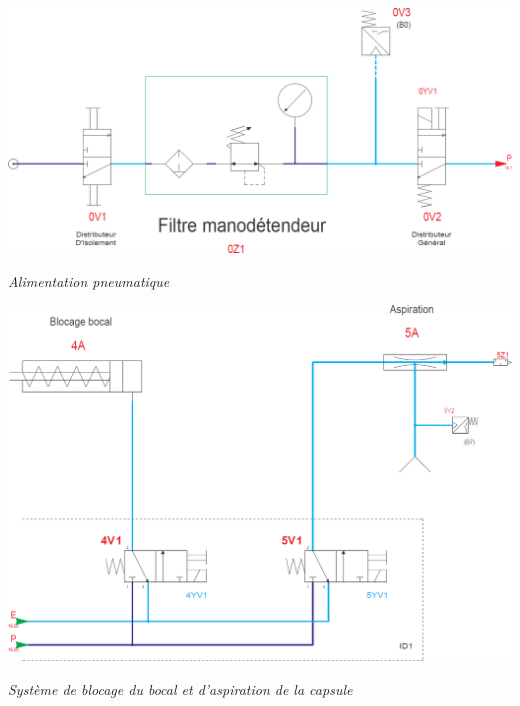 \documentclass[10pt]{article}
\begin{document}
\begin{minipage}[b]{.48\linewidth}
\begin{center}
\includegraphics[width=\textwidth]{images/AlimPneu}

\textit{Alimentation pneumatique}
\end{center}
\end{minipage}\hfill
\begin{minipage}[b]{.48\linewidth}
\begin{center}
\includegraphics[width=\textwidth]{images/Pneu02}

\textit{Système de blocage du bocal et d'aspiration de la capsule}
\end{center}
\end{minipage}

\vspace{.5cm}
\end{document}
